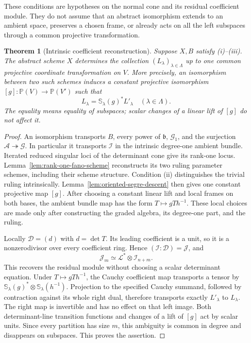 \documentclass[11pt,reqno]{amsart}
\numberwithin{equation}{section}
\newtheorem{theorem}{Theorem}[section]
\theoremstyle{definition}\newtheorem{definition}[theorem]{Definition}
\theoremstyle{remark}\newtheorem{remark}[theorem]{Remark}
\newcommand{\Pj}{\mathbb P}\newcommand{\A}{\mathbb A}
\begin{document}
These conditions are hypotheses on the normal cone and its residual
coefficient module.  They do not assume that an abstract isomorphism
extends to an ambient space, preserves a chosen frame, or already acts
on all the left subspaces through a common projective transformation.

\begin{theorem}[Intrinsic coefficient reconstruction]
\label{thm:structural-coefficient-reconstruction}
Suppose \(X,B\) satisfy \textup{(i)--(iii)}.  The abstract scheme
\(X\) determines the collection \((L_\lambda)_{\lambda\in\Lambda}\)
up to one common projective coordinate transformation on \(V\).
More precisely, an isomorphism between two such schemes induces a
constant projective isomorphism \([g]:\Pj(V)\to\Pj(V')\) such that
\[
                L_\lambda=\mathbb S_\lambda(g)^*L'_\lambda
                       \quad(\lambda\in\Lambda).
\]
The equality means equality of subspaces; scalar changes of a linear
lift of \([g]\) do not affect it.
\end{theorem}
\begin{proof}
An isomorphism transports \(B\), every power of \(\mathfrak b\),
\(\mathcal G_1\), and the surjection
\(\mathcal A\twoheadrightarrow\mathcal G\).  In particular it
transports \(\mathcal I\) in the intrinsic degree-one ambient
bundle.  Iterated reduced singular loci of the determinant cone give
its rank-one locus.  Lemma~\ref{lem:rank-one-fano-scheme} reconstructs
its two ruling parameter schemes, including their scheme structure.
Condition \textup{(ii)} distinguishes the trivial ruling intrinsically.
Lemma~\ref{lem:oriented-segre-descent} then gives one constant
projective map \([g]\).  After choosing a constant linear lift and
local frames on both bases, the ambient bundle map has the form
\(T\mapsto gTh^{-1}\).  These local choices are made only after
constructing the graded algebra, its degree-one part, and the ruling.

Locally \(\mathcal D=(d)\) with \(d=\det T\).  Its leading
coefficient is a unit, so it is a nonzerodivisor over every coefficient
ring.  Hence \((\mathcal I:\mathcal D)=\mathcal J\), and
\[
 \mathcal J_m\simeq\mathcal L^*\otimes\mathcal I_{n+m}.
\]
This recovers the residual module without choosing a scalar determinant
equation.  Under \(T\mapsto gTh^{-1}\), the Cauchy coefficient
map transports a tensor by
\(\mathbb S_\lambda(g)^*\otimes\mathbb S_\lambda(h^{-1})\).
Projection to the specified Cauchy summand, followed by contraction
against its whole right dual, therefore transports exactly
\(L'_\lambda\) to \(L_\lambda\).  The right map is invertible
and has no effect on that left image.  Both determinant-line transition
functions and changes of a lift of \([g]\) act by scalar units.
Since every partition has size \(m\), this ambiguity is common
in degree and disappears on subspaces.  This proves the assertion.
\end{proof}
\end{document}
